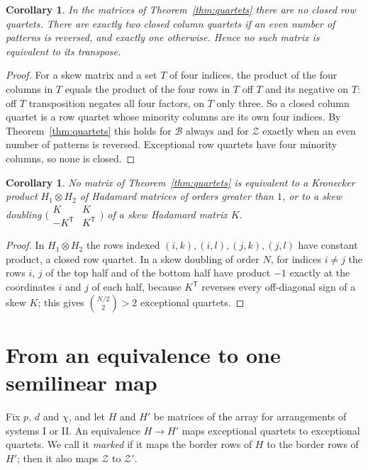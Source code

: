 \documentclass[11pt]{article}
\theoremstyle{plain}
\newtheorem{corollary}[theorem]{Corollary}
\theoremstyle{definition}
\theoremstyle{remark}
\begin{document}
\begin{corollary}\label{cor:closed}
In the matrices of Theorem~\ref{thm:quartets} there are no closed row
quartets. There are exactly two closed column quartets if an even number of
patterns is reversed, and exactly one otherwise. Hence no such matrix is
equivalent to its transpose.
\end{corollary}

\begin{proof}
For a skew matrix and a set $T$ of four indices, the product of the four
columns in $T$ equals the product of the four rows in $T$ off $T$ and its
negative on $T$: off $T$ transposition negates all four factors, on $T$ only
three. So a closed column quartet is a row quartet whose minority columns are
its own four indices. By Theorem~\ref{thm:quartets} this holds for
$\mathcal B$ always and for $\mathcal Z$ exactly when an even number of
patterns is reversed. Exceptional row quartets have four minority columns,
so none is closed.
\end{proof}

\begin{corollary}\label{cor:kron}
No matrix of Theorem~\ref{thm:quartets} is equivalent to a Kronecker product
$H_1\otimes H_2$ of Hadamard matrices of orders greater than $1$, or to a
skew doubling $\bigl(\begin{smallmatrix}K&K\\-K^{\mathsf T}&K^{\mathsf T}
\end{smallmatrix}\bigr)$ of a skew Hadamard matrix $K$.
\end{corollary}

\begin{proof}
In $H_1\otimes H_2$ the rows indexed $(i,k),(i,l),(j,k),(j,l)$ have constant
product, a closed row quartet. In a skew doubling of order $N$, for indices
$i\ne j$ the rows $i$, $j$ of the top half and of the bottom half have product
$-1$ exactly at the coordinates $i$ and $j$ of each half, because
$K^{\mathsf T}$ reverses every off-diagonal sign of a skew $K$; this gives
$\binom{N/2}2>2$ exceptional quartets.
\end{proof}

\section{From an equivalence to one semilinear map}\label{sec:frame}

Fix $p$, $d$ and $\chi$, and let $H$ and $H'$ be matrices of the array for
arrangements of systems I or II. An equivalence $H\to H'$ maps exceptional
quartets to exceptional quartets. We call it \emph{marked} if it maps the
border rows of $H$ to the border rows of $H'$; then it also maps $\mathcal Z$
to $\mathcal Z'$.
\end{document}
